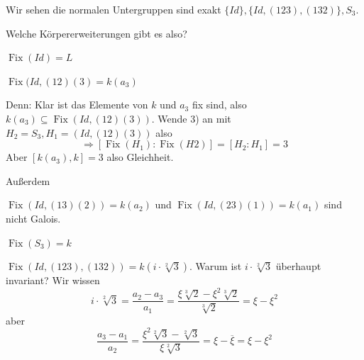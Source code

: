 \documentclass[12pt,parskip=full]{scrartcl}
\theoremstyle{definition}
\theoremstyle{remark}
\begin{document}
	Wir sehen die normalen Untergruppen sind exakt $\{ Id \}, \{ Id, (123), (132) \}, S_3$.
	
	Welche Körpererweiterungen gibt es also?
	
	$\operatorname{Fix}(Id) = L$
	
	$\operatorname{Fix}(Id, (12)(3) = k(a_3)$
	
	Denn: Klar ist das Elemente von $k$ und $a_3$ fix sind, also $k(a_3) \subseteq \operatorname{Fix}(Id, (12)(3))$. Wende 3) an mit $H_2 = S_3, H_1 = (Id, (12)(3))$ also
	\begin{equation*}
		\Rightarrow [\operatorname{Fix}(H_1): \operatorname{Fix}(H2)] = [H_2: H_1] = 3
	\end{equation*}
	Aber $[k(a_3), k] = 3$ also Gleichheit.
	
	Außerdem
	
	$\operatorname{Fix}(Id, (13)(2)) = k(a_2)$ und $\operatorname{Fix}(Id, (23)(1)) = k(a_1)$ sind nicht Galois.
	
	$\operatorname{Fix}(S_3) = k$
	
	$\operatorname{Fix}(Id, (123), (132)) = k(i \cdot \sqrt[2]{3})$. Warum ist $i \cdot \sqrt[2]{3}$ überhaupt invariant? Wir wissen
	\begin{equation*}
		i \cdot \sqrt[2]{3} = \frac{a_2 - a_3}{a_1} = \frac{\xi \sqrt[3]{2} - \xi^2 \sqrt[3]{2}}{\sqrt[3]{2}} = \xi - \xi^2
	\end{equation*}
	aber
	\begin{equation*}
		\frac{a_3 - a_1}{a_2} = \frac{\xi^2 \sqrt[2]{3} - \sqrt[2]{3}}{\xi \sqrt[2]{3}} = \xi - \overline{\xi} = \xi - \xi^2
	\end{equation*}
	
\end{document}
